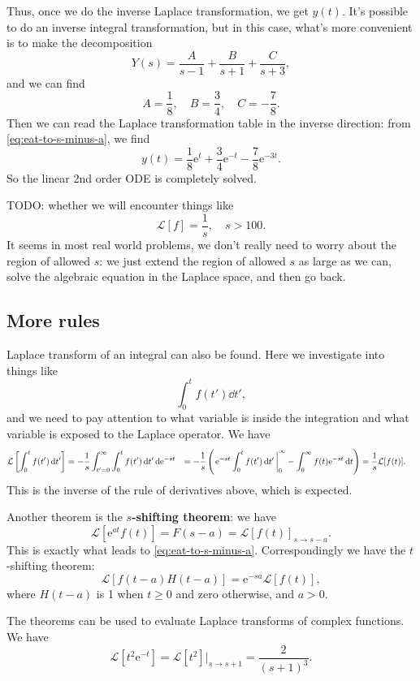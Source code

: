\documentclass[hyperref, a4paper]{article}
\newcommand*{\ee}{\mathrm{e}}
\newcommand*{\concept}[1]{{\textbf{#1}}}
\def\\{}%
\newcommand*{\laplace}{\mathcal{L}}
\newcommand*{\zerotoinf}{\int_{0}^{\infty}}
\begin{document}
Thus, once we do the inverse Laplace transformation, 
we get $y(t)$. 
It's possible to do an inverse integral transformation,
but in this case, what's more convenient is to make the decomposition 
\[
    Y(s) = \frac{A}{s - 1} + \frac{B}{s + 1} + \frac{C}{s + 3},
\]
and we can find 
\[
    A = \frac{1}{8}, \quad B = \frac{3}{4}, \quad C = - \frac{7}{8}.
\]
Then we can read the Laplace transformation table in the inverse direction:
from \eqref{eq:eat-to-s-minus-a}, 
we find 
\begin{equation}
    y(t) = \frac{1}{8} \ee^{t} + \frac{3}{4} \ee^{-t} - \frac{7}{8} \ee^{-3t}.
\end{equation}
So the linear 2nd order ODE is completely solved. 

TODO: whether we will encounter things like 
\begin{equation}
    \laplace[f] = \frac{1}{s}, \quad s > 100.
\end{equation}
It seems in most real world problems, 
we don't really need to worry about the region of allowed $s$:
we just extend the region of allowed $s$ as large as we can, 
solve the algebraic equation in the Laplace space, 
and then go back. 

\subsection{More rules}

Laplace transform of an integral can also be found. 
Here we investigate into things like 
\[
    \int_0^t f(t') \dd{t'},
\]
and we need to pay attention to what variable is inside the integration 
and what variable is exposed to the Laplace operator. 
We have 
\begin{equation}
    \begin{aligned}
        \laplace\left[
            \int_{0}^{t} f(t') \dd{t'}
        \right] &= - \frac{1}{s} \int_{t'=0}^{\infty} \int_{0}^{t} f(t') \dd{t'} \dd \ee^{-st} \\
        &= - \frac{1}{s} \left(
            \eval{\ee^{-st} \int_{0}^{t} f(t') \dd{t'}}_{0}^{\infty} - 
            \zerotoinf f(t) \ee^{-st} \dd{t} 
        \right) \\
        &= \frac{1}{s} \laplace[f(t)].
    \end{aligned}
\end{equation}
This is the inverse of the rule of derivatives above, 
which is expected. 

Another theorem is the \concept{$s$-shifting theorem}: 
we have 
\begin{equation}
    \laplace[\ee^{at} f(t)] = F(s-a) = \laplace[f(t)]_{s \to s - a}.
\end{equation}
This is exactly what leads to \eqref{eq:eat-to-s-minus-a}.
Correspondingly we have the $t$-shifting theorem: 
\begin{equation}
    \laplace[f(t-a) H(t-a)] = \ee^{-sa} \laplace[f(t)], 
\end{equation}
where $H(t-a)$ is 1 when $t \geq 0$ and zero otherwise,
and $a > 0$. 

The theorems can be used to evaluate Laplace transforms of complex functions. 
We have 
\begin{equation}
    \laplace[t^2 \ee^{-t}] = \laplace[t^2] |_{s \to s + 1}
    = \frac{2}{(s+1)^3}.
\end{equation}
\end{document}
